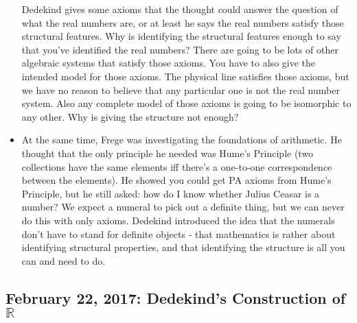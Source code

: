 \documentclass[12pt]{article}
\theoremstyle{definition}
\begin{document}
\begin{itemize}
        Dedekind gives some axioms that the thought could answer the question
        of what the real numbers are, or at least he says the real numbers
        satisfy those structural features. Why is identifying the structural
        features enough to say that you've identified the real numbers? There
        are going to be lots of other algebraic systems that satisfy those
        axioms. You have to also give the intended model for those axioms. The
        physical line satisfies those axioms, but we have no reason to believe
        that any particular one is not the real number system. Also any
        complete model of those axioms is going to be isomorphic to any other.
        Why is giving the structure not enough?
    \item
        At the same time, Frege was investigating the foundations of
        arithmetic. He thought that the only principle he needed was Hume's
        Principle (two collections have the same elements iff there's a
        one-to-one correspondence between the elements). He showed you could
        get PA axioms from Hume's Principle, but he still asked: how do I know
        whether Julius Ceasar is a number? We expect a numeral to pick out a
        definite thing, but we can never do this with only axioms. Dedekind
        introduced the idea that the numerals don't have to stand for definite
        objects - that mathematics is rather about identifying structural
        properties, and that identifying the structure is all you can and need
        to do. 
\end{itemize}

\subsection{February 22, 2017: Dedekind's Construction of $\mathbb{R}$}
\end{document}

